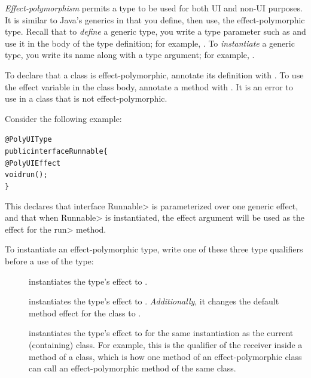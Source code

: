 \emph{Effect-polymorphism} permits a type to be used for both UI and non-UI
purposes.  It is similar to Java's generics in that you define, then use, the
effect-polymorphic type.
Recall that to \emph{define} a generic type, you write a type parameter such as
 and use it in the body of the type definition; for example,
 .
To \emph{instantiate} a generic type, you write its name along with a type
argument; for example, .



To declare that a class is effect-polymorphic, annotate its definition with
.
To use the effect variable in the class body, annotate a method with .
It is an error to use  in a class that is not
effect-polymorphic.


Consider the following example:

\begin{alltt}
@PolyUIType
public interface Runnable \{
    @PolyUIEffect
    void run();
\}
\end{alltt}

\noindent
This declares that interface \<Runnable> is parameterized over one
generic effect, and that when \<Runnable> is instantiated, the effect
argument will be used as the effect for the \<run> method.



To instantiate an effect-polymorphic type, write one of these three type
qualifiers before a use of the type:
\begin{description}
\item[]
  instantiates the type's effect to .
\item[]
  instantiates the type's effect to .
  \emph{Additionally}, it changes the
  default method effect for the class to .
\item[]
  instantiates the type's
  effect to  for the same instantiation as the current
  (containing) class.  For example, this is the qualifier of the receiver
   inside a method of a  class, which is how
  one method of an effect-polymorphic class can call an effect-polymorphic
  method of the same class.
\end{description}

